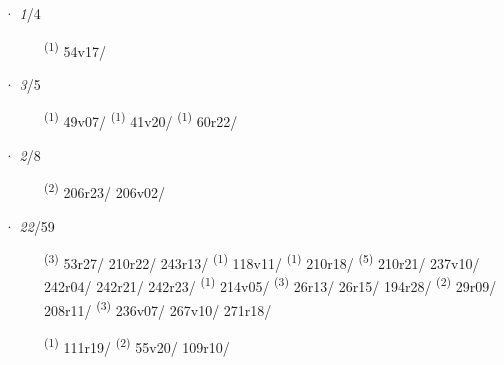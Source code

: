 \ENTRYEND
\noindent{} · \textit{1}/4 \LEMMALINE
\begin{description}
    \item[]  \textsuperscript{(1)} \mbox{54v17/}
\end{description}
\ENTRYEND
\noindent{} · \textit{3}/5 \LEMMALINE
\begin{description}
    \item[]  \textsuperscript{(1)} \mbox{49v07/} \CASEBREAK {} \textsuperscript{(1)} \mbox{41v20/} \CASEBREAK {} \textsuperscript{(1)} \mbox{60r22/}
\end{description}
\ENTRYEND
\noindent{} · \textit{2}/8 \LEMMALINE
\begin{description}
    \item[]  \textsuperscript{(2)} \mbox{206r23/} \mbox{206v02/}
\end{description}
\ENTRYEND
\noindent{} · \textit{22}/59 \LEMMALINE
\begin{description}
    \item[]  \textsuperscript{(3)} \mbox{53r27/} \mbox{210r22/} \mbox{243r13/} \textsuperscript{(1)} \mbox{118v11/} \textsuperscript{(1)} \mbox{210r18/} \textsuperscript{(5)} \mbox{210r21/} \mbox{237v10/} \mbox{242r04/} \mbox{242r21/} \mbox{242r23/} \textsuperscript{(1)} \mbox{214v05/} \CASEBREAK {} \textsuperscript{(3)} \mbox{26r13/} \mbox{26r15/} \mbox{194r28/} \textsuperscript{(2)} \mbox{29r09/} \mbox{208r11/} \textsuperscript{(3)} \mbox{236v07/} \mbox{267v10/} \mbox{271r18/}
    \item[]  \textsuperscript{(1)} \mbox{111r19/} \CASEBREAK {} \textsuperscript{(2)} \mbox{55v20/} \mbox{109r10/}
\end{description}
